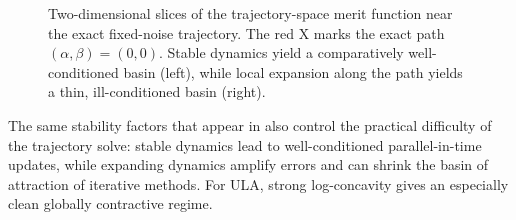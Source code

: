 \documentclass[11pt]{article}
\begin{document}
\begin{figure}[t]
  \centering
  
  \caption{Two-dimensional slices of the trajectory-space merit function near the exact fixed-noise trajectory.
  The red X marks the exact path $(\alpha,\beta)=(0,0)$.
  Stable dynamics yield a comparatively well-conditioned basin (left), while local expansion along the path yields a thin, ill-conditioned basin (right).}
  \label{fig:parallel-mcmc-trajectory-landscape}
\end{figure}

The same stability factors that appear in  also control the practical difficulty of the trajectory solve: stable dynamics lead to well-conditioned parallel-in-time updates, while expanding dynamics amplify errors and can shrink the basin of attraction of iterative methods.
For ULA, strong log-concavity gives an especially clean globally contractive regime.
\end{document}
